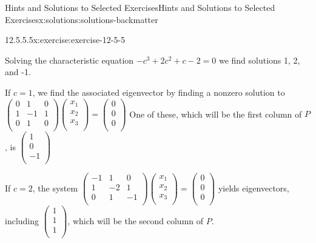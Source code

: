 \documentclass[twoside,10pt,]{book}
\numberwithin{equation}{section}
\begin{document}
\begin{solutions-chapter}{Hints and Solutions to Selected Exercises}{}{Hints and Solutions to Selected Exercises}{}{}{x:solutions:solutions-backmatter}
\begin{divisionsolution}{12.5.5.5}{}{x:exercise:exercise-12-5-5}
\begin{enumerate}[label=(\alph*)]
Solving the characteristic equation \(-c^3+2 c^2+c-2=0\) we find solutions 1, 2, and -1.%
\par
If \(c=1\), we find the associated eigenvector by finding a nonzero solution to \(\left(
\begin{array}{ccc}
0 & 1 & 0 \\
1 & -1 & 1 \\
0 & 1 & 0 \\
\end{array}
\right)\left(
\begin{array}{c}
x_1 \\
x_2 \\
x_3 \\
\end{array}
\right)=\left(
\begin{array}{c}
0 \\
0 \\
0 \\
\end{array}
\right)\) One of these, which will be the first column of \(P\), is \(\left(
\begin{array}{c}
1 \\
0 \\
-1 \\
\end{array}
\right)\)%
\par
If \(c=2\), the system \(\left(
\begin{array}{ccc}
-1 & 1 & 0 \\
1 & -2 & 1 \\
0 & 1 & -1 \\
\end{array}
\right)\left(
\begin{array}{c}
x_1 \\
x_2 \\
x_3 \\
\end{array}
\right)=\left(
\begin{array}{c}
0 \\
0 \\
0 \\
\end{array}
\right)\)  yields eigenvectors, including \(\left(
\begin{array}{c}
1 \\
1 \\
1 \\
\end{array}
\right)\), which will be the second column of \(P\).%
\par

\end{enumerate}
\end{divisionsolution}
\end{solutions-chapter}
\end{document}
